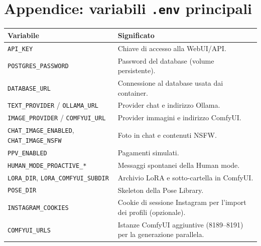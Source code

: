 \documentclass[11pt,a4paper]{article}
\begin{document}
\section{Appendice: variabili \texttt{.env} principali}
\begin{table}[h]
\centering
\begin{tabularx}{\textwidth}{l X}
\toprule
\textbf{Variabile} & \textbf{Significato} \\
\midrule
\texttt{API\_KEY} & Chiave di accesso alla WebUI/API. \\
\texttt{POSTGRES\_PASSWORD} & Password del database (volume persistente). \\
\texttt{DATABASE\_URL} & Connessione al database usata dai container. \\
\texttt{TEXT\_PROVIDER} / \texttt{OLLAMA\_URL} & Provider chat e indirizzo Ollama. \\
\texttt{IMAGE\_PROVIDER} / \texttt{COMFYUI\_URL} & Provider immagini e indirizzo ComfyUI. \\
\texttt{CHAT\_IMAGE\_ENABLED}, \texttt{CHAT\_IMAGE\_NSFW} & Foto in chat e contenuti NSFW. \\
\texttt{PPV\_ENABLED} & Pagamenti simulati. \\
\texttt{HUMAN\_MODE\_PROACTIVE\_*} & Messaggi spontanei della Human mode. \\
\texttt{LORA\_DIR}, \texttt{LORA\_COMFYUI\_SUBDIR} & Archivio LoRA e sotto-cartella in ComfyUI. \\
\texttt{POSE\_DIR} & Skeleton della Pose Library. \\
\texttt{INSTAGRAM\_COOKIES} & Cookie di sessione Instagram per l'import dei profili (opzionale). \\
\texttt{COMFYUI\_URLS} & Istanze ComfyUI aggiuntive (8189--8191) per la generazione parallela. \\
\bottomrule
\end{tabularx}
\end{table}
\end{document}
